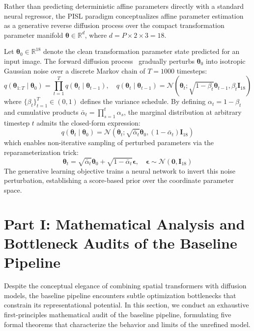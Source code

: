 Rather than predicting deterministic affine parameters directly with a standard neural regressor, the PISL paradigm conceptualizes affine parameter estimation as a generative reverse diffusion process over the compact transformation parameter manifold $\boldsymbol{\theta} \in \mathbb{R}^{d}$, where $d = P \times 2 \times 3 = 18$.

Let $\boldsymbol{\theta}_0 \in \mathbb{R}^{18}$ denote the clean transformation parameter state predicted for an input image. The forward diffusion process~\cite{ho2020denoising} gradually perturbs $\boldsymbol{\theta}_0$ into isotropic Gaussian noise over a discrete Markov chain of $T = 1000$ timesteps:
\begin{equation}
    q(\boldsymbol{\theta}_{1:T} \mid \boldsymbol{\theta}_0) = \prod_{t=1}^T q(\boldsymbol{\theta}_t \mid \boldsymbol{\theta}_{t-1}), \quad q(\boldsymbol{\theta}_t \mid \boldsymbol{\theta}_{t-1}) = \mathcal{N}\left(\boldsymbol{\theta}_t; \sqrt{1 - \beta_t}\boldsymbol{\theta}_{t-1}, \beta_t \mathbf{I}_{18}\right)
\end{equation}
where $\{\beta_t\}_{t=1}^T \in (0, 1)$ defines the variance schedule. By defining $\alpha_t = 1 - \beta_t$ and cumulative products $\bar{\alpha}_t = \prod_{s=1}^t \alpha_s$, the marginal distribution at arbitrary timestep $t$ admits the closed-form expression:
\begin{equation}
    q(\boldsymbol{\theta}_t \mid \boldsymbol{\theta}_0) = \mathcal{N}\left(\boldsymbol{\theta}_t; \sqrt{\bar{\alpha}_t}\boldsymbol{\theta}_0, (1 - \bar{\alpha}_t)\mathbf{I}_{18}\right)
\end{equation}
which enables non-iterative sampling of perturbed parameters via the reparameterization trick:
\begin{equation}
    \boldsymbol{\theta}_t = \sqrt{\bar{\alpha}_t}\boldsymbol{\theta}_0 + \sqrt{1 - \bar{\alpha}_t}\boldsymbol{\epsilon}, \quad \boldsymbol{\epsilon} \sim \mathcal{N}(\mathbf{0}, \mathbf{I}_{18})
\end{equation}
The generative learning objective trains a neural network to invert this noise perturbation, establishing a score-based prior over the coordinate parameter space.

\section{Part I: Mathematical Analysis and Bottleneck Audits of the Baseline Pipeline}
\label{sec:math_audits}

Despite the conceptual elegance of combining spatial transformers with diffusion models, the baseline pipeline encounters subtle optimization bottlenecks that constrain its representational potential. In this section, we conduct an exhaustive first-principles mathematical audit of the baseline pipeline, formulating five formal theorems that characterize the behavior and limits of the unrefined model.

